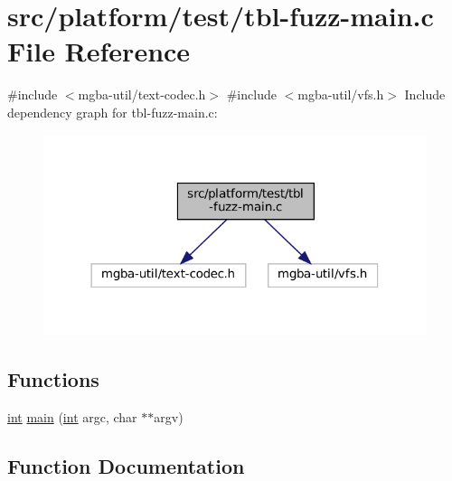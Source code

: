 \hypertarget{tbl-fuzz-main_8c}{}\section{src/platform/test/tbl-\/fuzz-\/main.c File Reference}
\label{tbl-fuzz-main_8c}
{\ttfamily \#include $<$mgba-\/util/text-\/codec.\+h$>$}\newline
{\ttfamily \#include $<$mgba-\/util/vfs.\+h$>$}\newline
Include dependency graph for tbl-\/fuzz-\/main.c\+:
\nopagebreak
\begin{figure}[H]
\begin{center}
\leavevmode
\includegraphics[width=318pt]{tbl-fuzz-main_8c__incl}
\end{center}
\end{figure}
\subsection*{Functions}
\begin{DoxyCompactItemize}
\item 
\mbox{\hyperlink{ioapi_8h_a787fa3cf048117ba7123753c1e74fcd6}{int}} \mbox{\hyperlink{tbl-fuzz-main_8c_a3c04138a5bfe5d72780bb7e82a18e627}{main}} (\mbox{\hyperlink{ioapi_8h_a787fa3cf048117ba7123753c1e74fcd6}{int}} argc, char $\ast$$\ast$argv)
\end{DoxyCompactItemize}


\subsection{Function Documentation}
\mbox{\label{tbl-fuzz-main_8c_a3c04138a5bfe5d72780bb7e82a18e627}} 
